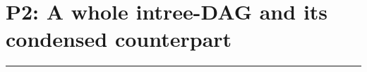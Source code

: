 \documentclass{report}
\begin{document}
\newcommand{\leveltop}{0}
\newcommand{\leveltopI}{0}
\newcommand{\leveltopII}{0}
\newcommand{\leveltopIII}{0}
\newcommand{\leveltopIIII}{0}
\newcommand{\leveltopIIIII}{0}
\newcommand{\leveltopIIIIII}{0}
\newcommand{\leveltopIIIIIII}{0}
\newcommand{\leveltopIIIIIIII}{0}
\newcommand{\leveltopIIIIIIIII}{0}
\newcommand{\leveltopIIIIIIIIII}{0}
\newcommand{\leveltopIIIIIIIIIII}{0}
\newcommand{\leveltopIIIIIIIIIIII}{0}
\newcommand{\leveltopIIIIIIIIIIIII}{0}
\newcommand{\leveltopIIIIIIIIIIIIII}{0}
\newcommand{\leveltopIIIIIIIIIIIIIII}{0}
\newcommand{\leveltopIIIIIIIIIIIIIIII}{0}
\newcommand{\leveltopIIIIIIIIIIIIIIIII}{0}
\newcommand{\leveltopIIIIIIIIIIIIIIIIII}{0}
\newcommand{\leveltopIIIIIIIIIIIIIIIIIII}{0}
\newcommand{\leveltopIIIIIIIIIIIIIIIIIIII}{0}
\newcommand{\leveltopIIIIIIIIIIIIIIIIIIIII}{0}
\newcommand{\leveltopIIIIIIIIIIIIIIIIIIIIII}{0}
\newcommand{\leveltopIIIIIIIIIIIIIIIIIIIIIII}{0}
\newcommand{\leveltopIIIIIIIIIIIIIIIIIIIIIIII}{0}
\newcommand{\leveltopIIIIIIIIIIIIIIIIIIIIIIIII}{0}
\newcommand{\leveltopIIIIIIIIIIIIIIIIIIIIIIIIII}{0}
\newcommand{\leveltopIIIIIIIIIIIIIIIIIIIIIIIIIII}{0}
\newcommand{\leveltopIIIIIIIIIIIIIIIIIIIIIIIIIIII}{0}
\newcommand{\leveltopIIIIIIIIIIIIIIIIIIIIIIIIIIIII}{0}

\section{P2: A whole intree-DAG and its condensed counterpart}



\hrule
\end{document}
